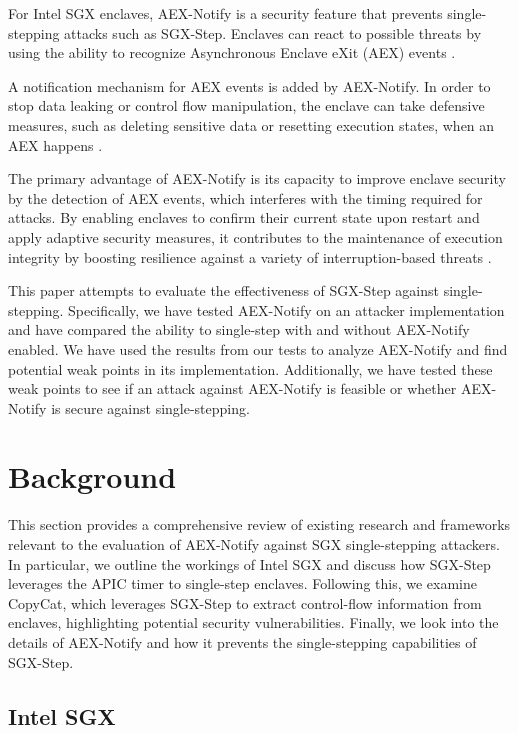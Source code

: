 \documentclass{llncs}
\begin{document}
For Intel SGX enclaves, AEX-Notify is a security feature that prevents single-stepping attacks such as SGX-Step. Enclaves can react to possible threats by using the ability to recognize Asynchronous Enclave eXit (AEX) events \cite{ConstableBCXXAK23}.

A notification mechanism for AEX events is added by AEX-Notify. In order to stop data leaking or control flow manipulation, the enclave can take defensive measures, such as deleting sensitive data or resetting execution states, when an AEX happens \cite{ConstableBCXXAK23}.

The primary advantage of AEX-Notify is its capacity to improve enclave security by the detection of AEX events, which interferes with the timing required for attacks. By enabling enclaves to confirm their current state upon restart and apply adaptive security measures, it contributes to the maintenance of execution integrity by boosting resilience against a variety of interruption-based threats \cite{ConstableBCXXAK23}.

This paper attempts to evaluate the effectiveness of SGX-Step against single-stepping.
Specifically, we have tested AEX-Notify on an attacker implementation
and have compared the ability to single-step with and without AEX-Notify enabled.
We have used the results from our tests to analyze AEX-Notify and
find potential weak points in its implementation.
Additionally, we have tested these weak points to see if an attack against AEX-Notify is feasible
or whether AEX-Notify is secure against single-stepping.

\section{Background}

This section provides a comprehensive review of existing research and frameworks
relevant to the evaluation of AEX-Notify against SGX single-stepping attackers.
In particular, we outline the workings of Intel SGX and
discuss how SGX-Step leverages the APIC timer to single-step enclaves.
Following this, we examine CopyCat, which leverages SGX-Step to extract
control-flow information from enclaves, highlighting potential security
vulnerabilities.
Finally, we look into the details of AEX-Notify and
how it prevents the single-stepping capabilities of SGX-Step.

\subsection{Intel SGX}
\end{document}
